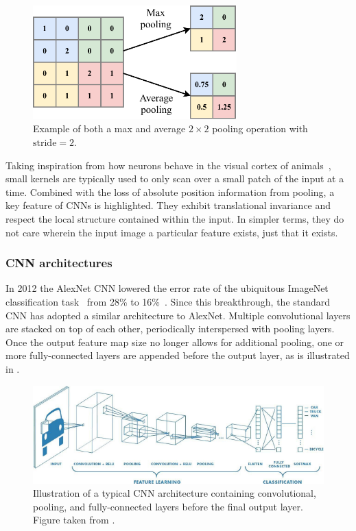 \begin{figure} %
    \includegraphics[width=0.7\textwidth]{diagrams/6-cnn/pooling.pdf}
    \caption[Example of pooling operation]
    {Example of both a max and average $2 \times 2$ pooling operation with $\text{stride}=2$.}
    \label{fig:pooling}
\end{figure}

Taking inspiration from how neurons behave in the visual cortex of animals~\cite{lecun2015}, small
kernels are typically used to only scan over a small patch of the input at a time. Combined with
the loss of absolute position information from pooling, a key feature of CNNs is highlighted. They
exhibit translational invariance and respect the local structure contained within the input. In
simpler terms, they do not care wherein the input image a particular feature exists, just that it
exists.

\subsubsection*{CNN architectures} %

In 2012 the AlexNet CNN lowered the error rate of the ubiquitous ImageNet classification
task~\cite{deng2009} from 28\% to 16\%~\cite{krizhevsky2012}. Since this breakthrough, the
standard CNN has adopted a similar architecture to AlexNet. Multiple convolutional layers are
stacked on top of each other, periodically interspersed with pooling layers. Once the output
feature map size no longer allows for additional pooling, one or more fully-connected layers are
appended before the output layer, as is illustrated in .

\begin{figure} %
    \includegraphics[width=\textwidth]{diagrams/6-cnn/conv_diagram.pdf}
    \caption[Illustration of a typical Convolutional Neural Network architecture]
    {Illustration of a typical CNN architecture containing convolutional, pooling, and
        fully-connected layers before the final output layer. Figure taken from
        .}
    \label{fig:conv_diagram}
\end{figure}

